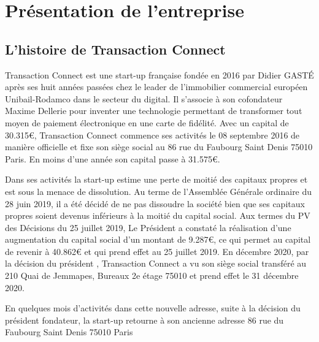 \chapter{Présentation de l'entreprise}
\minitoc
\newpage
 
\section{L’histoire de Transaction Connect}
Transaction Connect est une start-up française fondée en 2016 par Didier GASTÉ après ses huit années passées chez le leader de l’immobilier commercial européen Unibail-Rodamco dans le secteur du digital. Il s’associe à son cofondateur Maxime Dellerie pour inventer une technologie permettant de transformer tout moyen de paiement électronique en une carte de fidélité. Avec un capital de 30.315€, Transaction Connect commence ses activités le 08 septembre 2016 de manière officielle et fixe son siège social au 86 rue du Faubourg Saint Denis 75010 Paris. En moins d’une année son capital passe à 31.575€. 

Dans ses activités la start-up estime une perte de moitié des capitaux propres et est sous la menace de dissolution. Au terme de l’Assemblée Générale ordinaire du 28 juin 2019, il a été décidé de ne pas dissoudre la société bien que ses capitaux propres soient devenus inférieurs à la moitié du capital social. Aux termes du PV des Décisions du 25 juillet 2019, Le Président a constaté la réalisation d’une augmentation du capital social d’un montant de 9.287€, ce qui permet au capital de revenir à 40.862€ et qui prend effet au 25 juillet 2019. En décembre 2020, par la décision du président , Transaction Connect a vu son siège social transféré au 210 Quai de Jemmapes, Bureaux 2e étage 75010 et prend effet le 31 décembre 2020.

En quelques mois d’activités dans cette nouvelle adresse, suite à la décision du président fondateur, la start-up retourne à son ancienne adresse 86 rue du Faubourg Saint Denis 75010 Paris

\newpage
